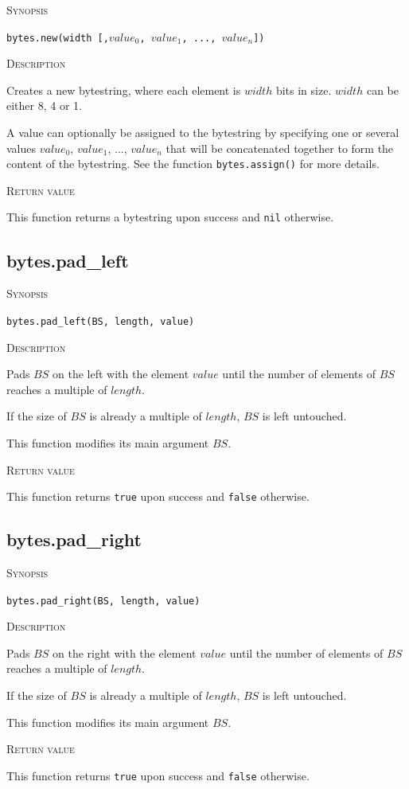 \documentclass[11pt]{report}
\newcommand{\mansection}[1]{\vspace{0.5em}\par\noindent\textsc{#1}\vspace{0.5em}\par}
\begin{document}
\mansection{Synopsis}
\texttt{bytes.new(width [,$value_0$, $value_1$, ..., $value_n$])}

\mansection{Description}
  Creates a new bytestring, where each element is $width$ bits in size.
  $width$ can be either 8, 4 or 1.

  A value can optionally be assigned to the bytestring by specifying one or 
  several values $value_0$, $value_1$, ..., $value_n$ that will be concatenated
  together to form the content of the bytestring. See the function 
  \texttt{bytes.assign()} for more details.
\mansection{Return value}
  This function returns a bytestring upon success and \texttt{nil} otherwise. 


\subsection{bytes.pad\_left}

\mansection{Synopsis}
\texttt{bytes.pad\_left(BS, length, value)}

\mansection{Description}
  Pads $BS$ on the left with the element $value$ until the number of elements 
  of $BS$ reaches a multiple of $length$.

  If the size of $BS$ is already a multiple of $length$, $BS$ is left untouched.

  This function modifies its main argument $BS$.
  
\mansection{Return value}
  This function returns \texttt{true} upon success and \texttt{false} otherwise.


\subsection{bytes.pad\_right}

\mansection{Synopsis}
\texttt{bytes.pad\_right(BS, length, value)}

\mansection{Description}
  Pads $BS$ on the right with the element $value$ until the number of elements 
  of $BS$ reaches a multiple of $length$.

  If the size of $BS$ is already a multiple of $length$, $BS$ is left untouched.

  This function modifies its main argument $BS$.
  
\mansection{Return value}
  This function returns \texttt{true} upon success and \texttt{false} otherwise.


\end{document}
